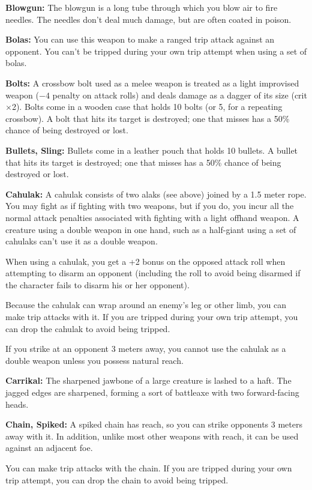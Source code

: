 \textbf{Blowgun:} The blowgun is a long tube through which you blow air to fire needles. The needles don't deal much damage, but are often coated in poison. 

\textbf{Bolas:} You can use this weapon to make a ranged trip attack against an opponent. You can't be tripped during your own trip attempt when using a set of bolas. 

\textbf{Bolts:} A crossbow bolt used as a melee weapon is treated as a light improvised weapon ($-4$ penalty on attack rolls) and deals damage as a dagger of its size (crit $\times$2). Bolts come in a wooden case that holds 10 bolts (or 5, for a repeating crossbow). A bolt that hits its target is destroyed; one that misses has a 50\% chance of being destroyed or lost. 

\textbf{Bullets, Sling:} Bullets come in a leather pouch that holds 10 bullets. A bullet that hits its target is destroyed; one that misses has a 50\% chance of being destroyed or lost. 

\textbf{Cahulak:} A cahulak consists of two alaks (see above) joined by a 1.5 meter rope. You may fight as if fighting with two weapons, but if you do, you incur all the normal attack penalties associated with fighting with a light offhand weapon. A creature using a double weapon in one hand, such as a half-giant using a set of cahulaks can't use it as a double weapon.

When using a cahulak, you get a +2 bonus on the opposed attack roll when attempting to disarm an opponent (including the roll to avoid being disarmed if the character fails to disarm his or her opponent).

Because the cahulak can wrap around an enemy's leg or other limb, you can make trip attacks with it. If you are tripped during your own trip attempt, you can drop the cahulak to avoid being tripped.

If you strike at an opponent 3 meters away, you cannot use the cahulak as a double weapon unless you possess natural reach. 

\textbf{Carrikal:} The sharpened jawbone of a large creature is lashed to a haft. The jagged edges are sharpened, forming a sort of battleaxe with two forward-facing heads.

\textbf{Chain, Spiked:} A spiked chain has reach, so you can strike opponents 3 meters away with it. In addition, unlike most other weapons with reach, it can be used against an adjacent foe.

You can make trip attacks with the chain. If you are tripped during your own trip attempt, you can drop the chain to avoid being tripped.

